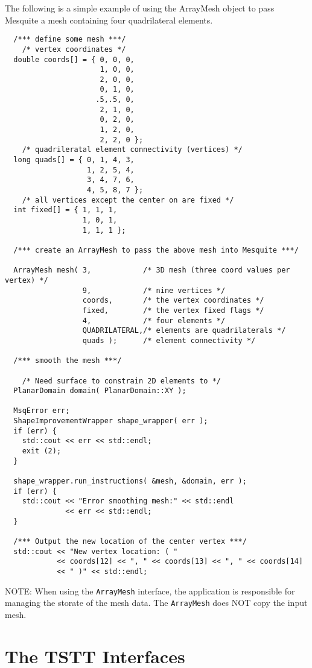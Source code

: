 The following is a simple example of using the ArrayMesh object to pass
Mesquite a mesh containing four quadrilateral elements.
\begin{verbatim}
  /*** define some mesh ***/
    /* vertex coordinates */
  double coords[] = { 0, 0, 0,
                      1, 0, 0,
                      2, 0, 0,
                      0, 1, 0,
                     .5,.5, 0,
                      2, 1, 0,
                      0, 2, 0,
                      1, 2, 0,
                      2, 2, 0 };
    /* quadrileratal element connectivity (vertices) */
  long quads[] = { 0, 1, 4, 3,
                   1, 2, 5, 4,
                   3, 4, 7, 6,
                   4, 5, 8, 7 };
    /* all vertices except the center on are fixed */
  int fixed[] = { 1, 1, 1,
                  1, 0, 1,
                  1, 1, 1 };
  
  /*** create an ArrayMesh to pass the above mesh into Mesquite ***/
  
  ArrayMesh mesh( 3,            /* 3D mesh (three coord values per vertex) */
                  9,            /* nine vertices */
                  coords,       /* the vertex coordinates */ 
                  fixed,        /* the vertex fixed flags */
                  4,            /* four elements */
                  QUADRILATERAL,/* elements are quadrilaterals */
                  quads );      /* element connectivity */
  
  /*** smooth the mesh ***/
  
    /* Need surface to constrain 2D elements to */
  PlanarDomain domain( PlanarDomain::XY );

  MsqError err;
  ShapeImprovementWrapper shape_wrapper( err );
  if (err) {
    std::cout << err << std::endl;
    exit (2);
  }
  
  shape_wrapper.run_instructions( &mesh, &domain, err );
  if (err) {
    std::cout << "Error smoothing mesh:" << std::endl
              << err << std::endl;
  }
  
  /*** Output the new location of the center vertex ***/
  std::cout << "New vertex location: ( "
            << coords[12] << ", " << coords[13] << ", " << coords[14]
            << " )" << std::endl;
\end{verbatim}

NOTE:  When using the \texttt{ArrayMesh} interface, the application is responsible for managing the storate of the mesh data.  The \texttt{ArrayMesh}
 does NOT copy the input mesh.  

\section{The TSTT Interfaces} \label{sec:TSTT}

